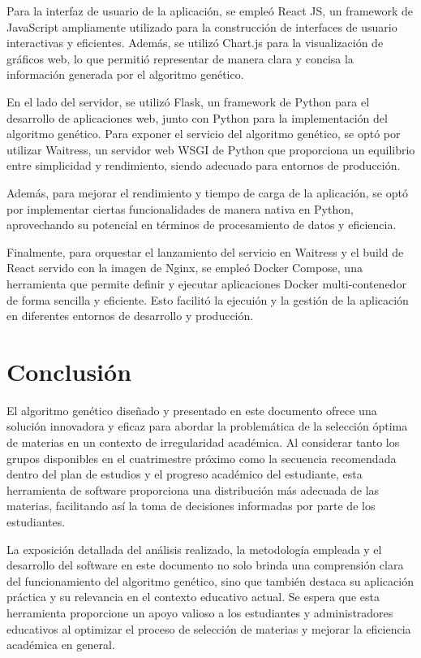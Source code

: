 Para la interfaz de usuario de la aplicación, se empleó React JS, un framework de JavaScript ampliamente utilizado para la construcción de interfaces de usuario interactivas y eficientes. Además, se utilizó Chart.js para la visualización de gráficos web, lo que permitió representar de manera clara y concisa la información generada por el algoritmo genético.

En el lado del servidor, se utilizó Flask, un framework de Python para el desarrollo de aplicaciones web, junto con Python para la implementación del algoritmo genético. Para exponer el servicio del algoritmo genético, se optó por utilizar Waitress, un servidor web WSGI de Python que proporciona un equilibrio entre simplicidad y rendimiento, siendo adecuado para entornos de producción.

Además, para mejorar el rendimiento y tiempo de carga de la aplicación, se optó por implementar ciertas funcionalidades de manera nativa en Python, aprovechando su potencial en términos de procesamiento de datos y eficiencia.

Finalmente, para orquestar el lanzamiento del servicio en Waitress y el build de React servido con la imagen de Nginx, se empleó Docker Compose, una herramienta que permite definir y ejecutar aplicaciones Docker multi-contenedor de forma sencilla y eficiente. Esto facilitó la ejecuión y la gestión de la aplicación en diferentes entornos de desarrollo y producción.


\section{Conclusión}

El algoritmo genético diseñado y presentado en este documento ofrece una solución innovadora y eficaz para abordar la problemática de la selección óptima de materias en un contexto de irregularidad académica. Al considerar tanto los grupos disponibles en el cuatrimestre próximo como la secuencia recomendada dentro del plan de estudios y el progreso académico del estudiante, esta herramienta de software proporciona una distribución más adecuada de las materias, facilitando así la toma de decisiones informadas por parte de los estudiantes.

La exposición detallada del análisis realizado, la metodología empleada y el desarrollo del software en este documento no solo brinda una comprensión clara del funcionamiento del algoritmo genético, sino que también destaca su aplicación práctica y su relevancia en el contexto educativo actual. Se espera que esta herramienta proporcione un apoyo valioso a los estudiantes y administradores educativos al optimizar el proceso de selección de materias y mejorar la eficiencia académica en general.
